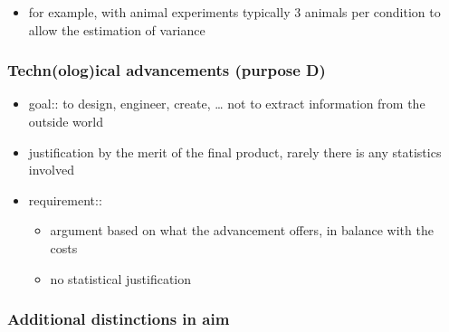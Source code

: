 \documentclass[]{article}
\providecommand{\tightlist}{%
  \setlength{\itemsep}{0pt}\setlength{\parskip}{0pt}}
\begin{document}
\begin{itemize}
\begin{itemize}
    \begin{itemize}
    \tightlist
    \item
      for example, with animal experiments typically 3 animals per
      condition to allow the estimation of variance
    \end{itemize}
  \end{itemize}
\end{itemize}

\subsubsection{Techn(olog)ical advancements (purpose
D)}\label{technological-advancements-purpose-d}

\begin{itemize}
\tightlist
\item
  goal:: to design, engineer, create, \ldots{} not to extract
  information from the outside world
\item
  justification by the merit of the final product, rarely there is any
  statistics involved
\item
  requirement::

  \begin{itemize}
  \tightlist
  \item
    argument based on what the advancement offers, in balance with the
    costs
  \item
    no statistical justification
  \end{itemize}
\end{itemize}

\subsubsection{Additional distinctions in
aim}\label{additional-distinctions-in-aim}
\end{document}
